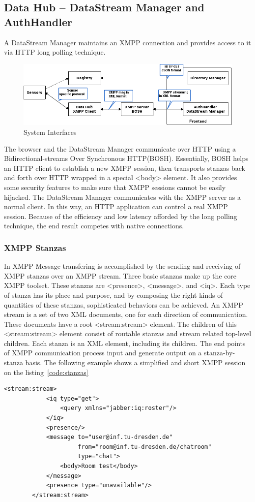 \subsection{Data Hub -- DataStream Manager and AuthHandler}
	A DataStream Manager maintains an XMPP connection and provides access to it via HTTP long polling technique.
	    \begin{figure}[!ht]
		\centering
		\includegraphics[scale=0.6]{images/XMPPflow.png}   
		\caption[System Interfaces]{System Interfaces}
        \label{img:interface}                      
		\end{figure}

	The browser and the DataStream Manager communicate over HTTP using a Bidirectional-streams Over Synchronous HTTP(BOSH). Essentially, BOSH helps an HTTP client to establish a new XMPP session, then transports stanzas back and forth over HTTP wrapped in a special <body> element. It also provides some security features to make sure that XMPP sessions cannot be easily hijacked. The DataStream Manager communicates with the XMPP server as a normal client. In this way, an HTTP application can control a real XMPP session. Because of the efficiency and low latency afforded by the long polling technique, the end result competes with native connections.

\subsubsection{XMPP Stanzas}
	In XMPP Message transfering is accomplished by the sending and receiving of XMPP stanzas over an XMPP stream. Three basic stanzas make up the core XMPP toolset. These stanzas are <presence>, <message>, and <iq>. Each type of stanza has its place and purpose, and by composing the right kinds of quantities of these stanzas, sophisticated behaviors can be achieved. An XMPP stream is a set of two XML documents, one for each direction of communication. These documents have a root <stream:stream> element. The children of this <stream:stream> element consist of routable stanzas and stream related top-level children. Each stanza is an XML element, including its children. The end points of XMPP communication process input and generate output on a stanza-by-stanza basis. The following example shows a simplified and short XMPP session on the listing~\ref{code:stanzas}
		\begin{lstlisting}[label=code:stanzas,caption=Stanzas Format]
		<stream:stream>
			<iq type="get">
				<query xmlns="jabber:iq:roster"/>
			</iq>
			<presence/>
			<message to="user@inf.tu-dresden.de"
					 from="room@inf.tu-dresden.de/chatroom"
			         type="chat">
			    <body>Room test</body>
			</message> 
			<presence type="unavailable"/>
		</stream:stream>
		\end{lstlisting}

